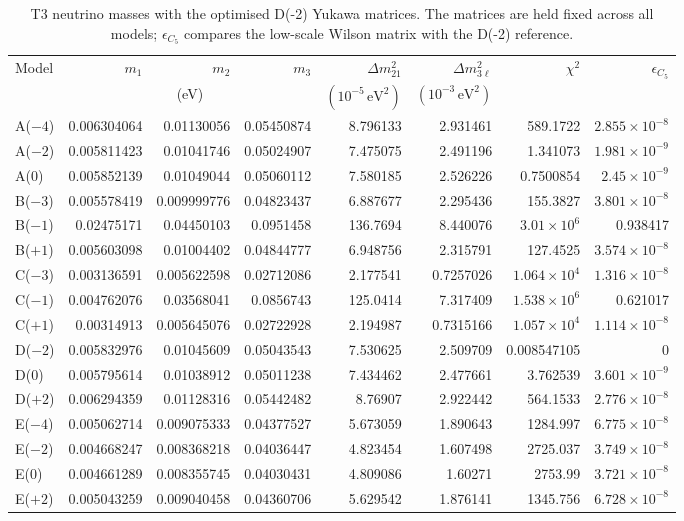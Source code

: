 \begin{table}[p]
\centering
\caption{T3 neutrino masses with the optimised D(-2) Yukawa matrices. The matrices are held fixed across all models; $\epsilon_{C_5}$ compares the low-scale Wilson matrix with the D(-2) reference.}
\label{tab:appC_Dm2_masses}
\begingroup
\footnotesize
\setlength{\tabcolsep}{3.2pt}
\begin{tabular}{lrrrrrrr}
\hline
Model & $m_1$ & $m_2$ & $m_3$ & $\Delta m^2_{21}$ & $\Delta m^2_{3\ell}$ & $\chi^2$ & $\epsilon_{C_5}$ \\
 & \multicolumn{3}{c}{(eV)} & $(10^{-5}\,\mathrm{eV}^2)$ & $(10^{-3}\,\mathrm{eV}^2)$ &  &  \\
\hline
A($-4$) & 0.006304064 & 0.01130056 & 0.05450874 & 8.796133 & 2.931461 & 589.1722 & $2.855\times10^{-8}$ \\
A($-2$) & 0.005811423 & 0.01041746 & 0.05024907 & 7.475075 & 2.491196 & 1.341073 & $1.981\times10^{-9}$ \\
A($0$) & 0.005852139 & 0.01049044 & 0.05060112 & 7.580185 & 2.526226 & 0.7500854 & $2.45\times10^{-9}$ \\
B($-3$) & 0.005578419 & 0.009999776 & 0.04823437 & 6.887677 & 2.295436 & 155.3827 & $3.801\times10^{-8}$ \\
B($-1$) & 0.02475171 & 0.04450103 & 0.0951458 & 136.7694 & 8.440076 & $3.01\times10^{6}$ & 0.938417 \\
B($+1$) & 0.005603098 & 0.01004402 & 0.04844777 & 6.948756 & 2.315791 & 127.4525 & $3.574\times10^{-8}$ \\
C($-3$) & 0.003136591 & 0.005622598 & 0.02712086 & 2.177541 & 0.7257026 & $1.064\times10^{4}$ & $1.316\times10^{-8}$ \\
C($-1$) & 0.004762076 & 0.03568041 & 0.0856743 & 125.0414 & 7.317409 & $1.538\times10^{6}$ & 0.621017 \\
C($+1$) & 0.00314913 & 0.005645076 & 0.02722928 & 2.194987 & 0.7315166 & $1.057\times10^{4}$ & $1.114\times10^{-8}$ \\
D($-2$) & 0.005832976 & 0.01045609 & 0.05043543 & 7.530625 & 2.509709 & 0.008547105 & 0 \\
D($0$) & 0.005795614 & 0.01038912 & 0.05011238 & 7.434462 & 2.477661 & 3.762539 & $3.601\times10^{-9}$ \\
D($+2$) & 0.006294359 & 0.01128316 & 0.05442482 & 8.76907 & 2.922442 & 564.1533 & $2.776\times10^{-8}$ \\
E($-4$) & 0.005062714 & 0.009075333 & 0.04377527 & 5.673059 & 1.890643 & 1284.997 & $6.775\times10^{-8}$ \\
E($-2$) & 0.004668247 & 0.008368218 & 0.04036447 & 4.823454 & 1.607498 & 2725.037 & $3.749\times10^{-8}$ \\
E($0$) & 0.004661289 & 0.008355745 & 0.04030431 & 4.809086 & 1.60271 & 2753.99 & $3.721\times10^{-8}$ \\
E($+2$) & 0.005043259 & 0.009040458 & 0.04360706 & 5.629542 & 1.876141 & 1345.756 & $6.728\times10^{-8}$ \\
\hline
\end{tabular}
\endgroup
\end{table}
